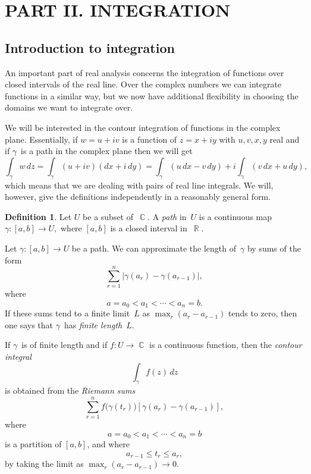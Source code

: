 \documentclass{amsproc}
\theoremstyle{definition}
\newtheorem{definition}[theorem]{Definition}
\theoremstyle{remark}
\DeclareMathOperator{\R}{\mathbb{R}}
\DeclareMathOperator{\C}{\mathbb{C}}
\numberwithin{equation}{section}
\begin{document}
\vfill\pagebreak


\section*{PART II. INTEGRATION}

\subsection{Introduction to integration} \label{CMS6}

An important part of real analysis concerns the integration of functions over closed intervals of the real line. Over the complex numbers we can integrate
functions in a similar way, but we now have additional flexibility in choosing the domains we want to integrate over.

We will be interested in the contour integration of functions in the complex plane. Essentially, if $ w = u + iv $ is a function of $ z = x + iy $ with $ u,v,x,y $
real and if $ \gamma $~is a path in the complex plane then we will get
$$
\int_\gamma w\,dz = \int_\gamma (u + iv)(dx +i\,dy) = \int_\gamma (u\,dx - v\,dy) + i\int_\gamma (v\,dx + u\,dy),
$$
which means that we are dealing with pairs of real line integrals. We will, however, give the definitions independently in a reasonably general form.

\begin{definition} \label{CMD6.1}
Let $ U $ be a subset of~$ \C $. A \emph{path} in~$ U $ is a continuous map $ \gamma: [a,b] \to U, $ where $ [a,b] $ is a closed interval in~$ \R $.
\end{definition}

Let $ \gamma: [a,b] \to U $ be a path. We can approximate the length of~$ \gamma $ by sums of the form
$$
\sum_{r = 1}^n |\gamma(a_r) - \gamma(a_{r - 1})|,
$$
where
$$
a = a_0 < a_1 < \cdots < a_n = b.
$$
If these sums tend to a finite limit~$ L $ as $ \max_r(a_r - a_{r - 1}) $ tends to zero, then one says that $ \gamma $~has \emph{finite length}~$ L $.

If $ \gamma $~is of finite length and if $ f: U \to \C $ is a continuous function, then the \emph{contour integral}
$$
\int_\gamma f(z)\,dz
$$
is obtained from the \emph{Riemann sums}
$$
\sum_{r = 1}^n f\bigl(\gamma(t_r)\bigr)[\gamma(a_r) - \gamma(a_{r-1})],
$$
where
$$
a = a_0 < a_1 < \cdots < a_n = b
$$
is a partition of $ [a,b] $, and where
$$
a_{r - 1} \leq t_r \leq a_r,
$$
by taking the limit as $ \max_r(a_r - a_{r - 1}) \to 0 $.
\end{document}
